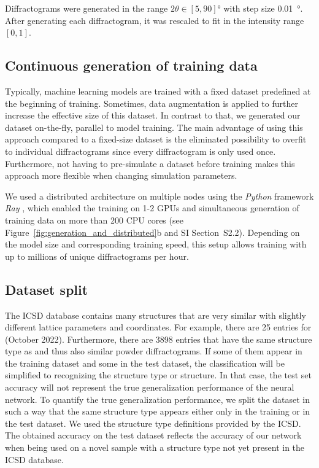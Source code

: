     Diffractograms were generated in the range $ 2 \theta \in \left[ 5, 90
    \right] \si{\degree} $ with step size \SI{0.01}{\degree}. After generating
    each diffractogram, it was rescaled to fit in the intensity range $ \left[
    0,1 \right]$. 

    \subsection{Continuous generation of training data}\label{sec:online_learning} 
    
    Typically, machine learning models are trained with a fixed dataset predefined at the beginning of training. Sometimes, data augmentation
    is applied to further increase the effective size of this dataset. In
    contrast to that, we generated our dataset on-the-fly, parallel to model training. The
    main advantage of using this approach compared to a fixed-size dataset is
    the eliminated possibility to overfit to individual diffractograms since
    every diffractogram is only used once. Furthermore, not having to
    pre-simulate a dataset before training makes this approach more flexible
    when changing simulation parameters.

    We used a distributed architecture on multiple nodes using the \emph{Python}
    framework \emph{Ray} \supercite{moritzRayDistributedFramework2018a}, which enabled the training on 1-2 GPUs and simultaneous generation of training data on more than 200 CPU cores (see Figure~\ref{fig:generation_and_distributed}b and SI Section~S2.2). 
    Depending on
    the model size and corresponding training speed, this setup allows
    training with up to millions of unique diffractograms per hour.

    \subsection{Dataset split} \label{sec:dataset_split} 
    
    The ICSD database contains many structures that are very similar with
    slightly different lattice parameters and coordinates. For example, there
    are 25 entries for  (October 2022). Furthermore,
    there are 3898 entries that have the same structure type as  and
    thus also similar powder diffractograms. If some of them appear in the
    training dataset and some in the test dataset, the classification will be
    simplified to recognizing the structure type or structure. In that case, the
    test set accuracy will not represent the true generalization performance of the neural
    network. To quantify the true generalization performance, we split the
    dataset in such a way that the same structure type appears either only in
    the training or in the test dataset. We used the structure type definitions
    provided by the ICSD. The obtained accuracy on the test dataset reflects the
    accuracy of our network when being used on a novel sample with a structure
    type not yet present in the ICSD database.

